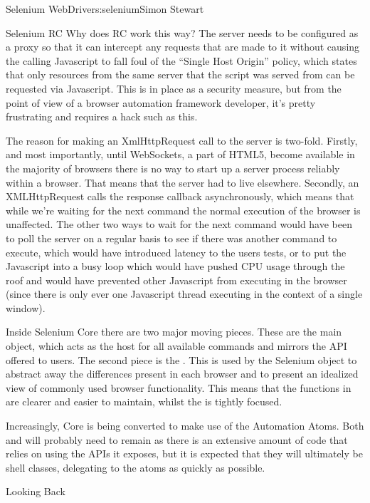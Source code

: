 \begin{aosachapter}{Selenium WebDriver}{s:selenium}{Simon Stewart}
\begin{aosasect1}{Selenium RC}
Why does RC work this way? The server needs to be configured as a
proxy so that it can intercept any requests that are made to it
without causing the calling Javascript to fall foul of the ``Single
Host Origin'' policy, which states that only resources from the same
server that the script was served from can be requested via
Javascript.  This is in place as a security measure, but from the
point of view of a browser automation framework developer, it's pretty
frustrating and requires a hack such as this.

The reason for making an XmlHttpRequest call to the server is
two-fold.  Firstly, and most importantly, until WebSockets, a part of
HTML5, become available in the majority of browsers there is no way to
start up a server process reliably within a browser.  That means that
the server had to live elsewhere. Secondly, an XMLHttpRequest calls
the response callback asynchronously, which means that while we're
waiting for the next command the normal execution of the browser is
unaffected. The other two ways to wait for the next command would have
been to poll the server on a regular basis to see if there was another
command to execute, which would have introduced latency to the users
tests, or to put the Javascript into a busy loop which would have
pushed CPU usage through the roof and would have prevented other
Javascript from executing in the browser (since there is only ever one
Javascript thread executing in the context of a single window).

Inside Selenium Core there are two major moving pieces. These are the
main  object, which acts as the host for all available
commands and mirrors the API offered to users. The second piece is the
. This is used by the Selenium object to abstract
away the differences present in each browser and to present an
idealized view of commonly used browser functionality. This means that
the functions in  are clearer and easier to maintain,
whilst the  is tightly focused.

Increasingly, Core is being converted to make use of the Automation
Atoms. Both  and  will probably need
to remain as there is an extensive amount of code that relies on using
the APIs it exposes, but it is expected that they will ultimately be
shell classes, delegating to the atoms as quickly as possible.

\end{aosasect1}

\begin{aosasect1}{Looking Back}


\end{aosasect1}
\end{aosachapter}
